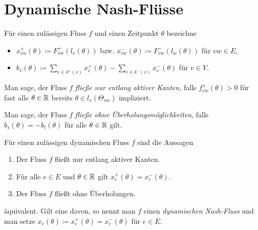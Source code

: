 \section{Dynamische Nash-Flüsse}

\begin{frame}
	\begin{definition}
		Für einen zulässigen Fluss $f$ und einen Zeitpunkt $\theta$ bezeichne
		\begin{itemize}[label=\color{darkblue}$\bullet$]
			\item $x_{vw}^+(\theta)\coloneq  F_{vw}^+(l_v(\theta))$ bzw. $x_{vw}^-(\theta)\coloneq  F^-_{vw}(l_w(\theta))$ für $vw\in E$,
			\pause\item $b_v(\theta) \coloneq  \sum_{e\in\delta^+(v)} x_e^+(\theta) - \sum_{e\in\delta^-(v)} x_e^-(\theta)$ für $v\in V$.
		\end{itemize}
	\end{definition}
	
	\pause\begin{definition}\label{def-flow-along-active-edges}
		Man sage, der Fluss $f$ \emph{fließe nur entlang aktiver Kanten}, falls $f_{vw}^+(\theta) > 0$ für fast alle $\theta\in\mathbb{R}$ bereits $\theta\in l_v(\Theta_{vw})$ impliziert.
	\end{definition}

	\pause\begin{definition}
	Man sage, der Fluss $f$ \emph{fließe ohne Überholungsmöglichkeiten}, falls $b_s(\theta) = -b_t(\theta)$ für alle $\theta\in\mathbb{R}$ gilt.
	\end{definition}
\end{frame}

\begin{frame}
	\begin{theorem}\label{thm-equivalencies-nash-flow}
		Für einen zulässigen dynamischen Fluss $f$ sind die Aussagen
		\begin{enumerate}[label=(\roman*)]
			\item Der Fluss $f$ fließt nur entlang aktiver Kanten.
			\item Für alle $e\in E$ und $\theta\in\mathbb{R}$ gilt $x_e^+(\theta) = x_e^-(\theta)$.
			\item Der Fluss $f$ fließt ohne Überholungen.
		\end{enumerate}
		äquivalent. Gilt eine davon, so nennt man $f$ einen \emph{dynamischen Nash-Fluss} und man setze $x_e(\theta)\coloneq x_e^+(\theta) = x_e^-(\theta)$ für $e\in E$.
	\end{theorem}
\end{frame}